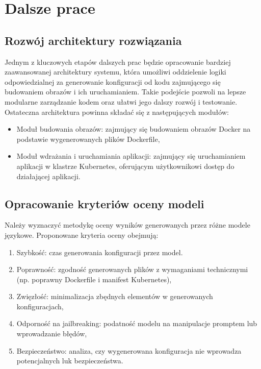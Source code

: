 \clearpage %
\section{Dalsze prace}

\subsection{Rozwój architektury rozwiązania} 

Jednym z kluczowych etapów dalszych prac będzie opracowanie bardziej zaawansowanej architektury systemu, która umożliwi oddzielenie logiki odpowiedzialnej za generowanie konfiguracji od kodu zajmującego się budowaniem obrazów i ich uruchamianiem. Takie podejście pozwoli na lepsze modularne zarządzanie kodem oraz ułatwi jego dalszy rozwój i testowanie. Ostateczna architektura powinna składać się z następujących modułów:

\begin{itemize}
    
    \item Moduł budowania obrazów: zajmujący się budowaniem obrazów Docker na podstawie wygenerowanych plików Dockerfile,
    \item Moduł wdrażania i uruchamiania aplikacji: zajmujący się uruchamianiem aplikacji w klastrze Kubernetes, oferującym użytkownikowi dostęp do działającej aplikacji.
\end{itemize}

\subsection{Opracowanie kryteriów oceny modeli}

Należy wyznaczyć metodykę oceny wyników generowanych przez różne modele językowe. Proponowane kryteria oceny obejmują:

\begin{enumerate}
    \item Szybkość: czas generowania konfiguracji przez model.
    \item Poprawność: zgodność generowanych plików z wymaganiami technicznymi (np. poprawny Dockerfile i manifest Kubernetes),
    \item Zwięzłość: minimalizacja zbędnych elementów w generowanych konfiguracjach,
    \item Odporność na jailbreaking: podatność modelu na manipulacje promptem lub wprowadzanie błędów,
    \item Bezpieczeństwo: analiza, czy wygenerowana konfiguracja nie wprowadza potencjalnych luk bezpieczeństwa.
\end{enumerate}

